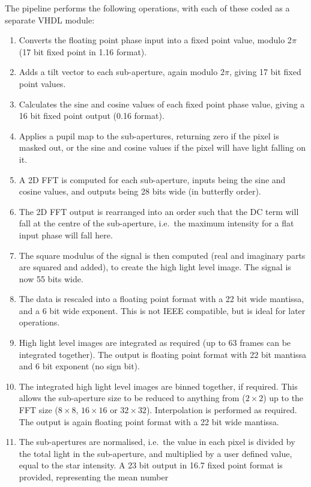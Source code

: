 \documentclass{article}
\begin{document}
The pipeline performs the following operations, with each of these
coded as a separate VHDL module:
\begin{enumerate}
\item Converts the floating point phase input into a fixed point value,
  modulo 2$\pi$ (17 bit fixed point in 1.16 format).  
\item Adds a tilt vector to each sub-aperture, again modulo 2$\pi$,
  giving 17 bit fixed point values.
\item Calculates the sine and cosine values of each fixed point phase
  value, giving a 16 bit fixed point output (0.16 format).
\item Applies a pupil map to the sub-apertures, returning zero if the
  pixel is masked out, or the sine and cosine values if the pixel will
  have light falling on it.
\item A 2D FFT is computed for each sub-aperture, inputs being the
  sine and cosine values, and outputs being 28 bits wide (in butterfly
  order).
\item The 2D FFT output is rearranged into an order such that the DC
  term will fall at the centre of the sub-aperture, i.e.\ the maximum
  intensity for a flat input phase will fall here.
\item The square modulus of the signal is then computed (real and
  imaginary parts are squared and added), to create the high light level
  image.  The signal is now 55 bits wide.
\item The data is rescaled into a floating point format with a 22 bit
  wide mantissa, and a 6 bit wide exponent.  This is not IEEE
  compatible, but is ideal for later operations.
\item High light level images are integrated as required (up to 63
  frames can be integrated together).  The output is floating point
  format with 22 bit mantissa and 6 bit exponent (no sign bit).
\item The integrated high light level images are binned together, if
  required.  This allows the sub-aperture size to be reduced to
  anything from ($2\times2$) up to the FFT size ($8\times8$,
  $16\times16$ or $32\times32$).  Interpolation is performed as
  required.  The output is again floating point format with a 22 bit
  wide mantissa.
\item The sub-apertures are normalised, i.e.\ the value in each pixel
  is divided by the total light in the sub-aperture, and multiplied by
  a user defined value, equal to the star intensity.  A 23 bit output
  in 16.7 fixed point format is provided, representing the mean number

\end{enumerate}
\end{document}
